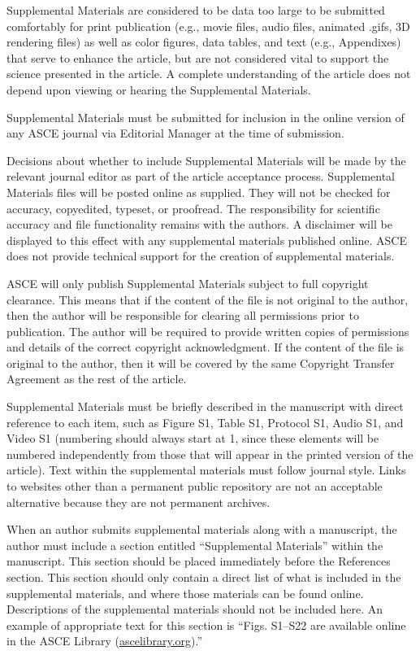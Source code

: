 \documentclass[Journal,LineNumbers]{ascelike-new}
\begin{document}
Supplemental Materials are considered to be data too large to be
submitted comfortably for print publication (e.g., movie files, audio
files, animated .gifs, 3D rendering files) as well as color figures,
data tables, and text (e.g., Appendixes) that serve to enhance the
article, but are not considered vital to support the science presented
in the article. A complete understanding of the article does not depend
upon viewing or hearing the Supplemental Materials.

Supplemental Materials must be submitted for inclusion in the online
version of any ASCE journal via Editorial Manager at the time of
submission.

Decisions about whether to include Supplemental Materials will be made
by the relevant journal editor as part of the article acceptance
process. Supplemental Materials files will be posted online as supplied.
They will not be checked for accuracy, copyedited, typeset, or
proofread. The responsibility for scientific accuracy and file
functionality remains with the authors. A disclaimer will be displayed
to this effect with any supplemental materials published online. ASCE
does not provide technical support for the creation of supplemental
materials.

ASCE will only publish Supplemental Materials subject to full copyright
clearance. This means that if the content of the file is not original to
the author, then the author will be responsible for clearing all
permissions prior to publication. The author will be required to provide
written copies of permissions and details of the correct copyright
acknowledgment. If the content of the file is original to the author,
then it will be covered by the same Copyright Transfer Agreement as the
rest of the article.

Supplemental Materials must be briefly described in the manuscript with
direct reference to each item, such as Figure S1, Table S1, Protocol S1,
Audio S1, and Video S1 (numbering should always start at 1, since these
elements will be numbered independently from those that will appear in
the printed version of the article). Text within the supplemental
materials must follow journal style. Links to websites other than a
permanent public repository are not an acceptable alternative because
they are not permanent archives.

When an author submits supplemental materials along with a manuscript,
the author must include a section entitled ``Supplemental Materials''
within the manuscript. This section should be placed immediately before
the References section. This section should only contain a direct list
of what is included in the supplemental materials, and where those
materials can be found online. Descriptions of the supplemental
materials should not be included here. An example of appropriate text
for this section is ``Figs. S1--S22 are available online in the ASCE
Library (\href{http://ascelibrary.org/}{ascelibrary.org}).''
\end{document}
